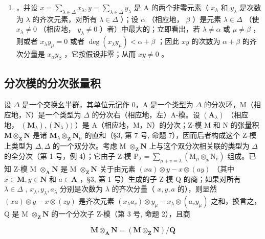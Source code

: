 \begin{enumerate}
\def\labelenumi{\arabic{enumi})}
\tightlist
\item
  ，并设 \(x = \sum_{\lambda \in \Delta} x_{\lambda}, y = \sum_{\lambda \in \Delta} y_{\lambda}\) 是 A 的两个非零元素（ \(x_{\lambda}\) 和 \(y_{\lambda}\) 是次数为 \(\lambda\) 的齐次元素，对所有 \(\lambda \in \Delta\) ）；设 \(\alpha\) （相应地， \(\beta\) ）是元素 \(\lambda \in \Delta\) （使 \(x_{\lambda} \neq 0\) （相应地， \(y_{\lambda} \neq 0\) ）者）中最大的；立即看出，若 \(\lambda \neq \alpha\) 或 \(\mu \neq \beta\) ，则或者 \(x_{\lambda}y_{\mu} = 0\) 或者 \(\deg(x_{\lambda}y_{\mu}) < \alpha + \beta\) ；因此 \(xy\) 的次数为 \(\alpha + \beta\) 的齐次分量是 \(x_{\alpha}y_{\beta}\) ，它按假设非零；从而 \(xy \neq 0\) 。
\end{enumerate}

\subsection{分次模的分次张量积}

设 \(\Delta\) 是一个交换幺半群，其单位元记作 0，A 是一个类型为 \(\Delta\) 的分次环，M（相应地，N）是一个类型为 \(\Delta\) 的分次右（相应地，左）A-模。设 \((\mathbf{A}_{\lambda})\) （相应地， \((\mathbf{M}_{\lambda}), (\mathbf{N}_{\lambda}))\) ）是 A（相应地，M，N）的分次；Z-模 M 和 N 的张量积 \(\mathbf{M} \otimes_{\mathbf{Z}} \mathbf{N}\) 是诸 \(\mathbf{M}_{\lambda} \otimes_{\mathbf{Z}} \mathbf{N}_{\mu}\) 的直和（§3, 第 7 号, 命题 7），因而后者构成这个 Z-模上类型为 \(\Delta, \Delta\) 的一个双分次。考虑 M \(\otimes_{\mathbf{Z}} \mathbf{N}\) 上与这个双分次相关联的类型为 \(\Delta\) 的全分次（第 1 号，例 4）；它由子 Z-模 \(\mathrm{P}_{\lambda} = \sum_{\mu + v = \lambda} (\mathrm{M}_{\mu} \otimes_{\mathbf{z}} \mathrm{N}_{v})\) 组成。已知 Z-模 M \(\otimes_{\mathbf{A}} \mathbf{N}\) 是 M \(\otimes_{\mathbf{Z}} \mathbf{N}\) 关于由元素 \((xa) \otimes y - x \otimes (ay)\) （其中 \(x \in \mathbf{M}, y \in \mathbf{N}\) 和 \(a \in \mathbf{A}\) ，§3, 第 1 号）生成的子 Z-模 Q 的商；如果对所有 \(\lambda \in \Delta\) , \(x_{\lambda}, y_{\lambda}, a_{\lambda}\) 分别是次数为 \(\lambda\) 的齐次分量（ \(x, y, a\) 的），则显然 \((xa) \otimes y - x \otimes (zy)\) 是齐次元素 \((x_{\lambda}a_{v}) \otimes y_{\mu} - x_{\lambda} \otimes (a_{v}y_{\mu})\) 之和，换言之，Q 是 M \(\otimes_{\mathbf{Z}} \mathbf{N}\) 的一个分次子 Z-模（第 3 号, 命题 2），且商

\[
\mathbf {M} \otimes_ {\mathbf {A}} \mathbf {N} = (\mathbf {M} \otimes_ {\mathbf {Z}} \mathbf {N}) / \mathbf {Q}
\]

